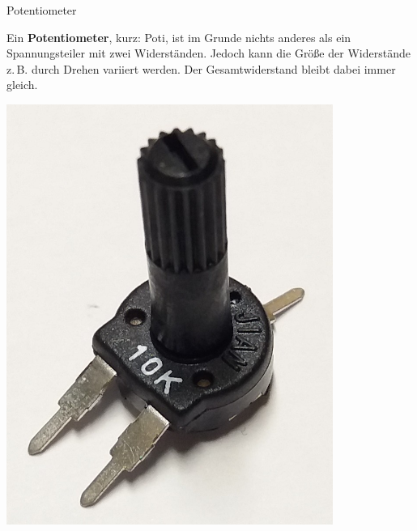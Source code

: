 \begin{zsfg}{Potentiometer}
	\begin{minipage}{0.7\textwidth}
		Ein \textbf{Potentiometer}, kurz: Poti, ist im Grunde nichts anderes als ein Spannungsteiler mit zwei Widerständen. Jedoch kann die Größe der Widerstände z.\,B. durch Drehen variiert werden. Der Gesamtwiderstand bleibt dabei immer gleich.
	\end{minipage}
	\hfill
	\begin{minipage}{0.28\textwidth}
		\begin{minipage}{0.48\textwidth}
			\centering
			\includegraphics[angle=-90,width=0.8\textwidth]{./pics/poti.jpg}
		\end{minipage}
		\hfill
		\begin{minipage}{0.48\textwidth}
			\centering

\end{minipage}
\end{minipage}
\end{zsfg}
